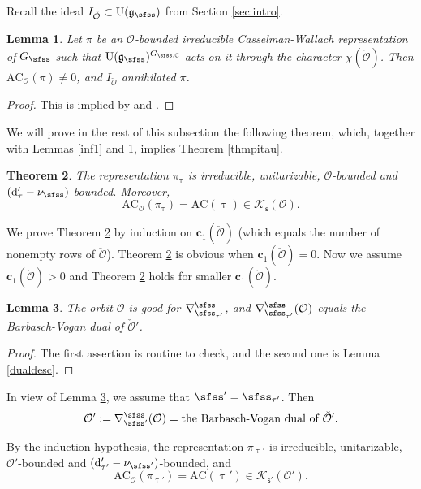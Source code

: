 \documentclass[12pt,a4paper]{amsart}
\newcommand{\CK}{{\mathcal {K}}}
\newcommand{\CO}{{\mathcal {O}}}
\newcommand{\oU}{\operatorname{U}}
\newcommand{\g}{\mathfrak g}
\numberwithin{equation}{section}
\newtheorem{thm}{Theorem}[section]
\newtheorem{lem}[thm]{Lemma}
\theoremstyle{remark}
\begin{document}
Recall the ideal $I_{\check \CO}\subset \oU(\g_\sfss)$ from Section \ref{sec:intro}.
\begin{lem}\label{inf2}
Let $\pi$ be an $\CO$-bounded irreducible Casselman-Wallach representation of $G_{\sfss}$ such that $\oU(\g_\sfss)^{G_{\sfss, \C}}$ acts on it  through the character $\chi(\check \CO)$. Then $\mathrm{AC}_{\CO}(\pi)\neq 0$, and  $I_{\check \CO}$ annihilated $\pi$.
\end{lem}
\begin{proof}
This is implied by \cite[Korollar 3.6]{BK} and \cite[Theorem 8.4]{Vo89}.

\end{proof}


We will prove in the rest of this subsection the following theorem, which, together with Lemmas \ref{inf1} and \ref{inf2},  implies  Theorem \ref{thmpitau}.
\begin{thm}\label{thmpitau222}
The representation $\pi_\uptau$ is irreducible, unitarizable, $\CO$-bounded and $( \mathrm d'_\tau-\nu_{\sfss})$-bounded.     Moreover,
\[
\mathrm{AC}_\CO(\pi_\uptau)=\mathrm{AC}(\uptau)\in \CK_{\mathsf s}(\CO).
\]
\end{thm}

We prove Theorem \ref{thmpitau222} by induction on $\mathbf c_1(\check \CO)$ (which equals the number of nonempty rows of $\check \CO$).  Theorem \ref{thmpitau222} is obvious when $\mathbf c_1(\check \CO)=0$. Now we assume $\mathbf c_1(\check \CO)>0$ and Theorem \ref{thmpitau222} holds for  smaller $\mathbf c_1(\check \CO)$.

 \begin{lem}\label{lem78}
 The orbit $\CO$ is good for $\nabla^\sfss_{\sfss_{\tau'}}$, and $\nabla^\sfss_{\sfss_{\tau'}}(\CO)$ equals the Barbasch-Vogan dual  of $\check \CO'$.
 \end{lem}
\begin{proof}
The first assertion is routine to check, and the second one is Lemma \ref{dualdesc}. %
\end{proof}

In view of Lemma \ref{lem78}, we assume that $\sfss'=\sfss_{\tau'}$. Then
\[
\CO':= \nabla^\sfss_{\sfss'}(\CO)=\textrm{the Barbasch-Vogan dual  of $\check \CO'$}.
\]



By the induction hypothesis, the representation $\pi_{\uptau'}$ is irreducible, unitarizable, $\CO'$-bounded and $( \mathrm d'_{\tau'}-\nu_{\sfss'})$-bounded,     and
\[
\mathrm{AC}_\CO(\pi_{\uptau'})=\mathrm{AC}(\uptau')\in \CK_{\mathsf s'}(\CO').
\]
\end{document}
